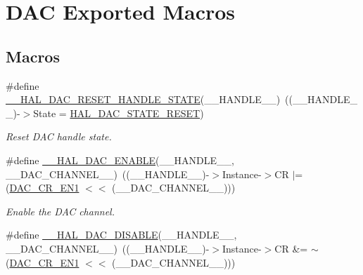 \hypertarget{group___d_a_c___exported___macros}{}\section{D\+AC Exported Macros}
\label{group___d_a_c___exported___macros}
\subsection*{Macros}
\begin{DoxyCompactItemize}
\item 
\#define \mbox{\hyperlink{group___d_a_c___exported___macros_gaeed5419f40f68699d0bfc088d122ebda}{\+\_\+\+\_\+\+H\+A\+L\+\_\+\+D\+A\+C\+\_\+\+R\+E\+S\+E\+T\+\_\+\+H\+A\+N\+D\+L\+E\+\_\+\+S\+T\+A\+TE}}(\+\_\+\+\_\+\+H\+A\+N\+D\+L\+E\+\_\+\+\_\+)~((\+\_\+\+\_\+\+H\+A\+N\+D\+L\+E\+\_\+\+\_\+)-\/$>$State = \mbox{\hyperlink{group___d_a_c___exported___types_gga4e917340aba1cc3afd4e9a7fef15e4a5a225221a33734e3bfaf96837205e9284a}{H\+A\+L\+\_\+\+D\+A\+C\+\_\+\+S\+T\+A\+T\+E\+\_\+\+R\+E\+S\+ET}})
\begin{DoxyCompactList}\small\item\em Reset D\+AC handle state. \end{DoxyCompactList}\item 
\#define \mbox{\hyperlink{group___d_a_c___exported___macros_gabb80fe4a8eadc6fd435b715bd0b54687}{\+\_\+\+\_\+\+H\+A\+L\+\_\+\+D\+A\+C\+\_\+\+E\+N\+A\+B\+LE}}(\+\_\+\+\_\+\+H\+A\+N\+D\+L\+E\+\_\+\+\_\+,  \+\_\+\+\_\+\+D\+A\+C\+\_\+\+C\+H\+A\+N\+N\+E\+L\+\_\+\+\_\+)~((\+\_\+\+\_\+\+H\+A\+N\+D\+L\+E\+\_\+\+\_\+)-\/$>$Instance-\/$>$CR $\vert$=  (\mbox{\hyperlink{group___peripheral___registers___bits___definition_gabd8cedbb3dda03d56ac0ba92d2d9cefd}{D\+A\+C\+\_\+\+C\+R\+\_\+\+E\+N1}} $<$$<$ (\+\_\+\+\_\+\+D\+A\+C\+\_\+\+C\+H\+A\+N\+N\+E\+L\+\_\+\+\_\+)))
\begin{DoxyCompactList}\small\item\em Enable the D\+AC channel. \end{DoxyCompactList}\item 
\#define \mbox{\hyperlink{group___d_a_c___exported___macros_gaccf3ac58df83aca87b760d8ea299cc1c}{\+\_\+\+\_\+\+H\+A\+L\+\_\+\+D\+A\+C\+\_\+\+D\+I\+S\+A\+B\+LE}}(\+\_\+\+\_\+\+H\+A\+N\+D\+L\+E\+\_\+\+\_\+,  \+\_\+\+\_\+\+D\+A\+C\+\_\+\+C\+H\+A\+N\+N\+E\+L\+\_\+\+\_\+)~((\+\_\+\+\_\+\+H\+A\+N\+D\+L\+E\+\_\+\+\_\+)-\/$>$Instance-\/$>$CR \&=  $\sim$(\mbox{\hyperlink{group___peripheral___registers___bits___definition_gabd8cedbb3dda03d56ac0ba92d2d9cefd}{D\+A\+C\+\_\+\+C\+R\+\_\+\+E\+N1}} $<$$<$ (\+\_\+\+\_\+\+D\+A\+C\+\_\+\+C\+H\+A\+N\+N\+E\+L\+\_\+\+\_\+)))

\end{DoxyCompactItemize}

